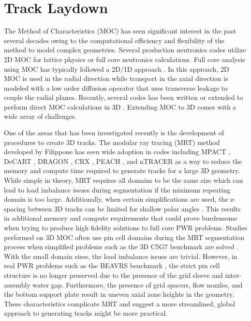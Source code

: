 \chapter{Track Laydown}
\label{chap:track-laydown}

The Method of Characteristics (MOC) has seen significant interest in the past several decades owing to the computational efficiency and flexibility of the method to model complex geometries. Several production neutronics codes utilize 2D MOC for lattice physics or full core neutronics calculations. Full core analysis using MOC has typically followed a 2D/1D approach \cite{ntracer, decart, 2d1d, CRX}. In this approach, 2D MOC is used in the radial direction while transport in the axial direction is modeled with a low order diffusion operator that uses transverse leakage to couple the radial planes. Recently, several codes has been written or extended to perform direct MOC calculations in 3D \cite{kochunas, MCI, 3D-MOC-annals}. Extending MOC to 3D comes with a wide array of challenges.

One of the areas that has been investigated recently is the development of procedures to create 3D tracks. The modular ray tracing (MRT) method developed by Filippone \cite{orig-moc-rt} has seen wide adoption in codes including MPACT \cite{mpact, kochunas}, DeCART \cite{decart}, DRAGON \cite{MCI}, CRX \cite{3D-MOC-annals}, PEACH \cite{PEACH}, and nTRACER \cite{ntracer} as a way to reduce the memory and compute time required to generate tracks for a large 3D geometry. While simple in theory, MRT requires all domains to be the same size which can lead to load imbalance issues during segmentation if the minimum repeating domain is too large. Additionally, when certain simplifications are used, the z-spacing between 3D tracks can be limited for shallow polar angles \cite{kochunas}. This results in additional memory and compute requirements that could prove burdensome when trying to produce high fidelity solutions to full core PWR problems. Studies performed on 3D MOC often use pin cell domains during the MRT segmentation process when simplified problems such as the 3D C5G7 benchmark are solved \cite{kochunas}. With the small domain sizes, the load imbalance issues are trivial. However, in real PWR problems such as the BEAVRS benchmark \cite{beavrs}, the strict pin cell structure is no longer preserved due to the presence of the grid sleeve and inter-assembly water gap. Furthermore, the presence of grid spacers, flow nozzles, and the bottom support plate result in uneven axial zone heights in the geometry. These characteristics complicate MRT and suggest a more streamlined, global approach to generating tracks might be more practical. 

